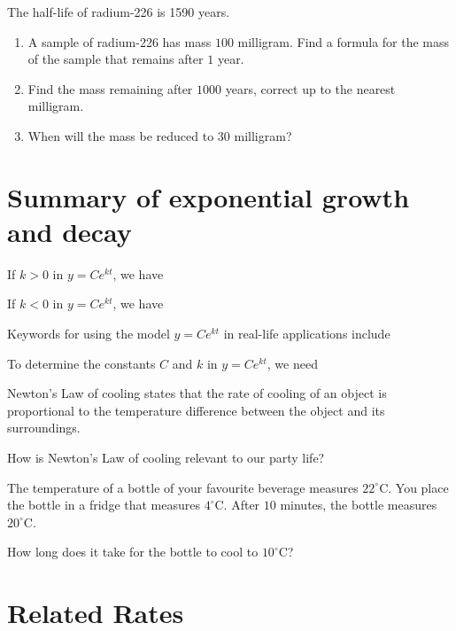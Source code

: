 \documentclass[../main.tex]{subfiles}
\begin{document}
\begin{example}
  The half-life of radium-226 is 1590 years. 
  \begin{enumerate}[label=(\alph*)]
  \item A sample of radium-226 has mass \(100\) milligram.  Find a formula for the mass of the sample that remains after \(1\) year.
  \item Find the mass remaining after \(1000\) years, correct up to the nearest milligram.
  \item When will the mass be reduced to \(30\) milligram?
  \end{enumerate}
\end{example}
\clearpage
\section{Summary of exponential growth and decay}

If \(k > 0\) in \(y = Ce^{kt}\), we have
\vspace{1in}

If \(k < 0\) in \(y = Ce^{kt}\), we have
\vspace{1in}

Keywords for using the model \(y = C e^{kt}\) in real-life applications include
\vspace{2in}

To determine the constants \(C\) and \(k\) in \(y = Ce^{kt}\), we need
\vspace{2in}

\clearpage

Newton's Law of cooling states that the rate of cooling of an object is proportional to the temperature difference between the object and its surroundings.

How is Newton's Law of cooling relevant to   our party life?
\vspace{4in}

\begin{example}
  The temperature of a bottle of your favourite beverage measures \({22}^{\circ}\)C. You place the bottle in a fridge that measures \({4}^{\circ}\)C. After \(10\) minutes, the bottle measures \({20}^{\circ}\)C. 

  How long does it take for the bottle to cool to \({10}^{\circ}\)C?
\end{example}
\clearpage

\section{Related Rates}
\end{document}
